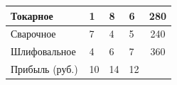 {\begin{table}[h]
\begin{tabular}{|l|p{0.12\linewidth}|p{0.12\linewidth}|p{0.12\linewidth}|c|}
Токарное                          & 1                                             & 8                                             & 6                                            & 280                                                                                                           \\ \hline
Сварочное                         & 7                                             & 4                                             & 5                                            & 240                                                                                                           \\ \hline
Шлифовальное                      & 4                                             & 6                                             & 7                                            & 360                                                                                                           \\ \hline
Прибыль (руб.)                    & 10                                            & 14                                            & 12                                           &                                                                                                               \\ \hline
\end{tabular}
\end{table}}
\vspace{6pt}

